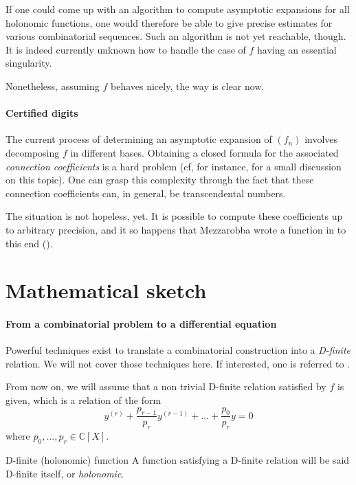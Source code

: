 \documentclass[../main.tex]{subfiles}
\begin{document}
If one could come up with an algorithm to compute asymptotic expansions for all holonomic functions, one would therefore be able to give precise estimates for various combinatorial sequences. Such an algorithm is not yet reachable, though. It is indeed currently unknown how to handle the case of $f$ having an essential singularity.

Nonetheless, assuming $f$ behaves nicely, the way is clear now.

\paragraph{Certified digits}

The current process of determining an asymptotic expansion of $(f_n)$ involves decomposing $f$ in different bases. Obtaining a closed formula for the associated \emph{connection coefficients} is a hard problem (cf, for instance, \cite{Melczer2020} for a small discussion on this topic). One can grasp this complexity through the fact that these connection coefficients can, in general, be transcendental numbers.

The situation is not hopeless, yet. It is possible to compute these coefficients up to arbitrary precision, and it so happens that Mezzarobba wrote a function in  to this end (\cite{mezzarobba2106}).

\section{Mathematical sketch}

\paragraph{From a combinatorial problem to a differential equation}
Powerful techniques exist to translate a combinatorial construction into a \emph{D-finite} relation.
We will not cover those techniques here. If interested, one is referred to \cite{Flajolet2009}.

From now on, we will assume that a non trivial D-finite relation satisfied by $f$ is given, which is a relation of the form
\begin{equation}\label{basic_eq_diff}
y^{(r)} + \frac{p_{r-1}}{p_r} y^{(r - 1)} + \dots + \frac{p_0}{p_r} y = 0
\end{equation}
where $p_0, \dots, p_r \in \mathbb{C}[X]$.

\begin{definition}{D-finite (holonomic) function}
	A function satisfying a D-finite relation will be said D-finite itself, or \emph{holonomic}.
\end{definition}
\end{document}
